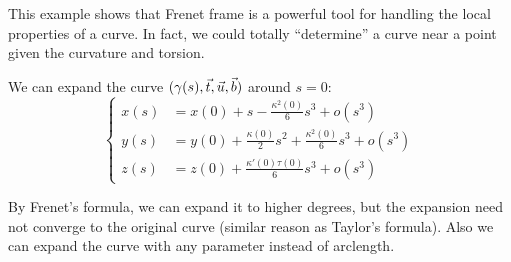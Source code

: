 This example shows that Frenet frame is a powerful tool
for handling the local properties of a curve.
In fact, we could totally ``determine'' a curve near a point
given the curvature and torsion.

\begin{example}
    We can expand the curve $(\gamma(s), \vec{t},\vec{u},\vec{b})$ around $s=0$:
	\[
	\left\{\begin{aligned}
			x(s) &= x(0) + s - \frac{\kappa^2(0)}{6}s^3 + o(s^3)\\
			y(s) &= y(0) + \frac{\kappa(0)}{2}s^2 + \frac{\kappa^2(0)}{6}s^3 + o(s^3)\\
			z(s) &= z(0) + \frac{\kappa'(0)\tau(0)}{6}s^3 + o(s^3)
	\end{aligned}\right.
	\]
\end{example}
\begin{remark}
    By Frenet's formula, we can expand it to higher degrees, but the expansion
	need not converge to the original curve (similar reason as Taylor's formula).
	Also we can expand the curve with any parameter instead of arclength.
\end{remark}

